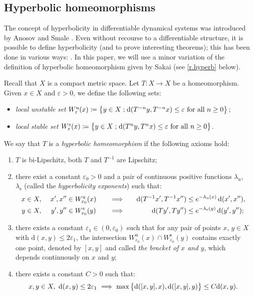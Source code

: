 \documentclass[10pt]{amsart}
\def\vcentcolon{\mathrel{\mathop\ordinarycolon}}
\providecommand\ordinarycolon{:}
\providecommand*\coloneqq{\vcentcolon\mathrel{\mkern-1.2mu}=}
\newcommand\implique{\mathchoice{\Longrightarrow}{\Rightarrow}{\Rightarrow}{\Rightarrow}}
\theoremstyle{plain}
\theoremstyle{definition}
\newcommand{\st}{\;\mathord{;}\;}
\newcommand{\dd}{\mathrm{d}}
\newcommand{\uu}{\mathrm{u}}
\renewcommand{\ss}{\mathrm{s}}
\let\epsilon\varepsilon
\begin{document}
\subsection{Hyperbolic homeomorphisms}\label{ss.hyp_homeo}

The concept of hyperbolicity in differentiable dynamical systems was introduced by Anosov \cite{Anosov} and Smale \cite{Smale}. Even without recourse to a differentiable structure, it is possible to define hyperbolicity (and to prove interesting theorems); this has been done in various ways: \cite{Bowen,Ruelle,AY,Akin,AH}. In this paper, we will use a minor variation of the definition of hyperbolic homeomorphism given by Sakai \cite{Sakai} (see \cref{r.hyperb} below).

Recall that $X$ is a compact metric space.
Let $T \colon X \to X$ be a homeomorphism.
Given $x \in X$ and $\epsilon>0$, we define the following sets:
\begin{itemize}
\item \emph{local unstable set} $W^\uu_\epsilon(x) \coloneqq \big\{ y \in X \st \dd(T^{-n} y, T^{-n} x) \le \epsilon \text{ for all } n\ge 0\big\}$;
\item \emph{local stable set} $W^\ss_\epsilon(x) \coloneqq \big\{ y \in X \st \dd(T^n y, T^n x) \le \epsilon \text{ for all } n\ge 0\big\}$.
\end{itemize}
We say that $T$ is a \emph{hyperbolic homeomorphism} if the following axioms hold:
\begin{enumerate}

\item\label{i.biLip}
$T$ is bi-Lipschitz, \ie both $T$ and $T^{-1}$ are Lipschitz;

\item\label{i.lambdas}
there exist a constant $\epsilon_0 > 0$ and a pair of continuous positive functions $\lambda_\uu$, $\lambda_\ss$ (called the \emph{hyperbolicity exponents}) such that:
\begin{alignat}{4}
\label{e.lambda_u}
x &\in X, &\ x', x'' &\in W^\uu_{\epsilon_0}(x) &\quad &\implique &\quad
\dd(T^{-1} x', T^{-1} x'') &\le e^{-\lambda_\uu(x)} \, \dd(x',x''), \\
\label{e.lambda_s}
y &\in X, &\ y', y'' &\in W^\ss_{\epsilon_0}(y) &\quad &\implique &\quad
\dd(T y', T y'') &\le e^{-\lambda_\ss(y)} \, \dd(y', y'') ;
\end{alignat}

\item\label{i.bracket}
there exists a constant $\epsilon_1 \in (0,\epsilon_0)$ such that for any pair of points $x$, $y \in X$ with $\dd(x,y) \le 2\epsilon_1$, the intersection $W^\uu_{\epsilon_0}(x) \cap W^\ss_{\epsilon_0}(y)$ contains exactly one point, denoted by $[x,y]$ and called \emph{the bracket of $x$ and $y$}, which depends continuously on $x$ and $y$;

\item\label{i.bounded_angles}
there exists a constant $C>0$ such that:
\begin{equation}\label{e.bounded_angles}
x, y \in X, \ \dd(x,y) \le 2\epsilon_1 \ \implique \
\max \big\{ \dd([x,y],x), \dd([x,y],y) \big\} \le C \dd(x,y).
\end{equation}
\end{enumerate}
\end{document}
